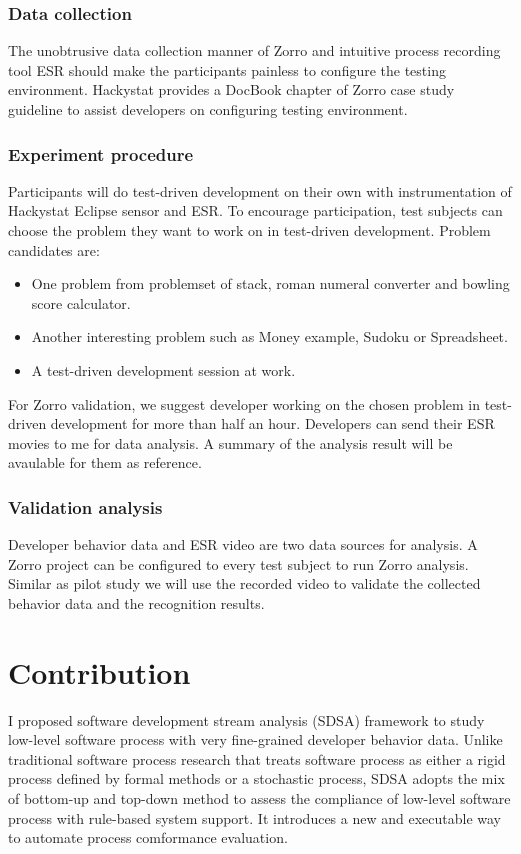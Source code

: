 \subsubsection{Data collection}
The unobtrusive data collection manner of Zorro and intuitive process
recording tool ESR\cite{esr} should make the participants painless to
configure the testing environment. Hackystat provides a DocBook chapter of
Zorro case study guideline\cite{Hackystat} to assist developers on
configuring testing environment.

\subsubsection{Experiment procedure}
Participants will do test-driven development on their own with
instrumentation of Hackystat Eclipse sensor and ESR. To encourage
participation, test subjects can choose the problem they want to work on
in test-driven development. Problem candidates are:
\begin{itemize}
\item One problem from problemset of stack, roman numeral converter and
  bowling score calculator.
\item Another interesting problem such as Money example, Sudoku or
  Spreadsheet.
\item A test-driven development session at work.
\end{itemize}

For Zorro validation, we suggest developer working on the chosen problem in
test-driven development for more than half an hour. Developers can send
their ESR movies to me for data analysis. A summary of the analysis result
will be avaulable for them as reference.

\subsubsection{Validation analysis}
Developer behavior data and ESR video are two data sources for analysis. A
Zorro project can be configured to every test subject to run Zorro
analysis. Similar as pilot study we will use the recorded video to validate
the collected behavior data and the recognition results. 

\section{Contribution}
I proposed software development stream analysis (SDSA) framework to study
low-level software process with very fine-grained developer behavior data.
Unlike traditional software process research that treats software process
as either a rigid process defined by formal methods or a stochastic
process, SDSA adopts the mix of bottom-up and top-down method to assess
the compliance of low-level software process with rule-based system
support. It introduces a new and executable way to automate process
comformance evaluation.

